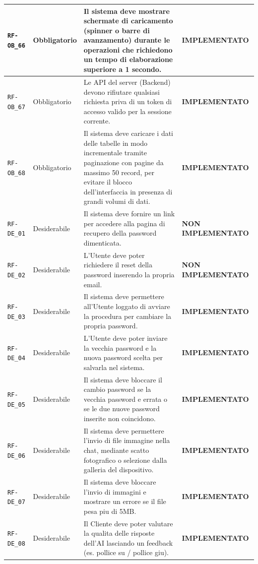 \documentclass[a4paper, 11pt, oneside]{scrartcl}
\begin{document}
\begin{longtable}{|>{\raggedright\arraybackslash}p{}|>{\raggedright\arraybackslash}p{}|>{\raggedright\arraybackslash}p{}|>{\raggedright\arraybackslash}p{}|}
    \hline
    \texttt{RF-OB\_66} & Obbligatorio & Il sistema deve mostrare schermate di caricamento (spinner o barre di avanzamento) durante le operazioni che richiedono un tempo di elaborazione superiore a 1 secondo. & \textbf{IMPLEMENTATO} \\
    \hline
    \texttt{RF-OB\_67} & Obbligatorio & Le API del server (Backend) devono rifiutare qualsiasi richiesta priva di un token di accesso valido per la sessione corrente. & \textbf{IMPLEMENTATO} \\
    \hline
    \texttt{RF-OB\_68} & Obbligatorio & Il sistema deve caricare i dati delle tabelle in modo incrementale tramite paginazione con pagine da massimo 50 record, per evitare il blocco dell'interfaccia in presenza di grandi volumi di dati. & \textbf{IMPLEMENTATO} \\
    \hline
    \texttt{RF-DE\_01} & Desiderabile & Il sistema deve fornire un link per accedere alla pagina di recupero della password dimenticata. & \textbf{NON IMPLEMENTATO} \\
    \hline
    \texttt{RF-DE\_02} & Desiderabile & L'Utente deve poter richiedere il reset della password inserendo la propria email. & \textbf{NON IMPLEMENTATO} \\
    \hline
    \texttt{RF-DE\_03} & Desiderabile & Il sistema deve permettere all'Utente loggato di avviare la procedura per cambiare la propria password. & \textbf{IMPLEMENTATO} \\
    \hline
    \texttt{RF-DE\_04} & Desiderabile & L'Utente deve poter inviare la vecchia password e la nuova password scelta per salvarla nel sistema. & \textbf{IMPLEMENTATO} \\
    \hline
    \texttt{RF-DE\_05} & Desiderabile & Il sistema deve bloccare il cambio password se la vecchia password e errata o se le due nuove password inserite non coincidono. & \textbf{IMPLEMENTATO} \\
    \hline
    \texttt{RF-DE\_06} & Desiderabile & Il sistema deve permettere l'invio di file immagine nella chat, mediante scatto fotografico o selezione dalla galleria del dispositivo. & \textbf{IMPLEMENTATO} \\
    \hline
    \texttt{RF-DE\_07} & Desiderabile & Il sistema deve bloccare l'invio di immagini e mostrare un errore se il file pesa piu di 5MB. & \textbf{IMPLEMENTATO} \\
    \hline
    \texttt{RF-DE\_08} & Desiderabile & Il Cliente deve poter valutare la qualita delle risposte dell'AI lasciando un feedback (es. pollice su / pollice giu). & \textbf{IMPLEMENTATO} \\

\end{longtable}
\end{document}
